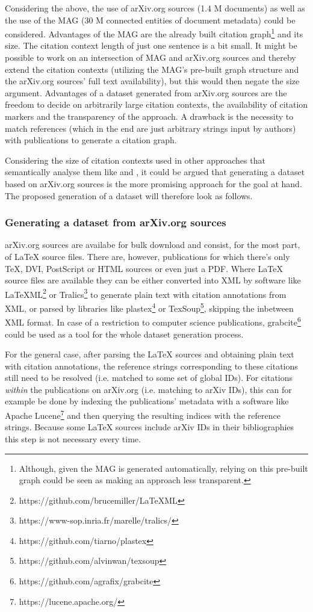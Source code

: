 \documentclass{proseminar}
\begin{document}
Considering the above, the use of arXiv.org sources (1.4 M documents) as well as the use of the MAG (30 M connected entities of document metadata) could be considered. Advantages of the MAG are the already built citation graph\footnote{Although, given the MAG is generated automatically, relying on this pre-built graph could be seen as making an approach less transparent.} and its size. The citation context length of just one sentence is a bit small. It might be possible to work on an intersection of MAG and arXiv.org sources and thereby extend the citation contexts (utilizing the MAG's pre-built graph structure and the arXiv.org sources' full text availability), but this would then negate the size argument. Advantages of a dataset generated from arXiv.org sources are the freedom to decide on arbitrarily large citation contexts, the availability of citation markers and the transparency of the approach. A drawback is the necessity to match references (which in the end are just arbitrary strings input by authors) with publications to generate a citation graph.

Considering the size of citation contexts used in other approaches that semantically analyse them like \cite{Duma2016} and \cite{Kobayashi2018}, it could be argued that generating a dataset based on arXiv.org sources is the more promising approach for the goal at hand. The proposed generation of a dataset will therefore look as follows.

\subsubsection{Generating a dataset from arXiv.org sources}
arXiv.org sources are availabe for bulk download and consist, for the most part, of LaTeX source files. There are, however, publications for which there's only TeX, DVI, PostScript or HTML sources or even just a PDF. Where LaTeX source files are available they can be either converted into XML by software like LaTeXML\footnote{https://github.com/brucemiller/LaTeXML} or Tralics\footnote{https://www-sop.inria.fr/marelle/tralics/} to generate plain text with citation annotations from XML, or parsed by libraries like plastex\footnote{https://github.com/tiarno/plastex} or TexSoup\footnote{https://github.com/alvinwan/texsoup}, skipping the inbetween XML format. In case of a restriction to computer science publications, grabcite\footnote{https://github.com/agrafix/grabcite} could be used as a tool for the whole dataset generation process.

For the general case, after parsing the LaTeX sources and obtaining plain text with citation annotations, the reference strings corresponding to these citations still need to be resolved (i.e. matched to some set of global IDs). For citations \emph{within} the publications on arXiv.org (i.e. matching to arXiv IDs), this can for example be done by indexing the publications' metadata with a software like Apache Lucene\footnote{https://lucene.apache.org/} and then querying the resulting indices with the reference strings. Because some LaTeX sources include arXiv IDs in their bibliographies this step is not necessary every time.
\end{document}

